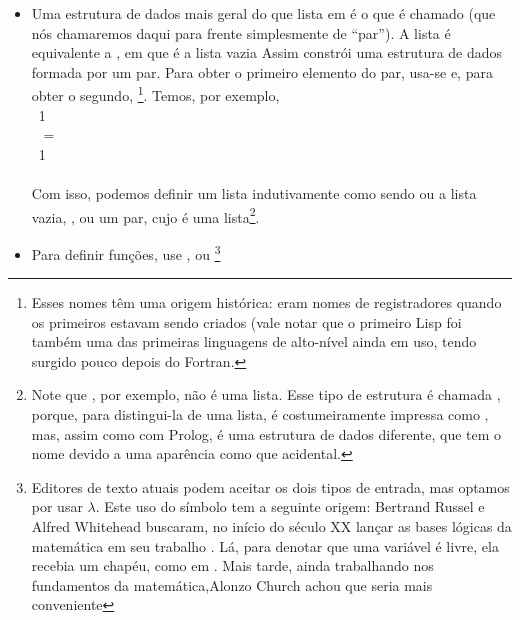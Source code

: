 \documentclass{article}
\begin{document}
\begin{itemize}
\item Uma estrutura de dados mais geral do que lista em
   é o que é chamado  (que nós
  chamaremos daqui para frente simplesmente de ``par''). A lista
   é equivalente a , em que  é a lista
  vazia
    Assim  constrói uma estrutura de
    dados formada por um par. Para obter o primeiro elemento do par,
    usa-se  e, para obter o segundo,
    \footnote{Esses nomes têm uma origem histórica:
      eram nomes de registradores quando os primeiros
       estavam sendo criados (vale notar que o
      primeiro Lisp foi também uma das primeiras linguagens de
      alto-nível ainda em uso, tendo surgido pouco depois do Fortran.}. Temos, por exemplo,\\
     \seta\ 1\\
     \seta\  =
    \\
     \seta\ 1\\
     \seta\ \\
    Com isso, podemos definir um lista indutivamente como sendo ou a
    lista vazia, , ou um par, cujo
     é uma lista\footnote{Note que ,
      por exemplo, não é uma lista. Esse tipo de estrutura é chamada
      , porque, para distingui-la de uma lista, é
      costumeiramente impressa como , mas, assim como
      com Prolog, é uma estrutura de dados diferente, que tem o nome
       devido a uma aparência como que acidental.}.
\item Para definir funções, use , ou
  \enphasisb{$\lambda$}\footnote{Editores de texto atuais podem aceitar os dois tipos de
    entrada, mas optamos por usar $\lambda$. Este uso do símbolo tem a
    seguinte origem: Bertrand Russel e Alfred Whitehead buscaram, no
    início do século XX lançar as bases lógicas da matemática em seu
    trabalho . Lá, para denotar que uma
    variável é livre, ela recebia um chapéu, como em . Mais tarde, ainda trabalhando nos fundamentos da
    matemática,Alonzo Church achou que seria mais conveniente
}
\end{itemize}
\end{document}
